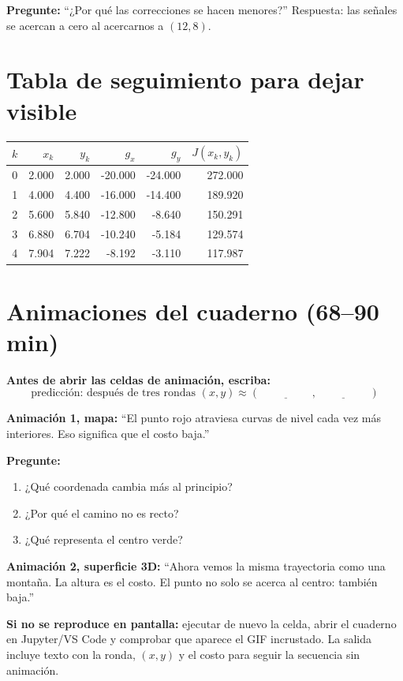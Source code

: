 \documentclass[11pt]{article}
\begin{document}
\textbf{Pregunte:} ``¿Por qué las correcciones se hacen menores?'' Respuesta:
las señales se acercan a cero al acercarnos a $(12,8)$.

\section*{Tabla de seguimiento para dejar visible}
\small
\begin{center}
\begin{tabular}{r|rr|rr|r}
\toprule
$k$&$x_k$&$y_k$&$g_x$&$g_y$&$J(x_k,y_k)$\\
\midrule
0&2.000&2.000&-20.000&-24.000&272.000\\
1&4.000&4.400&-16.000&-14.400&189.920\\
2&5.600&5.840&-12.800&-8.640&150.291\\
3&6.880&6.704&-10.240&-5.184&129.574\\
4&7.904&7.222&-8.192&-3.110&117.987\\
\bottomrule
\end{tabular}
\end{center}
\normalsize

\newpage
\section*{Animaciones del cuaderno (68--90 min)}
\textbf{Antes de abrir las celdas de animación, escriba:}
\[
\text{predicción: después de tres rondas }(x,y)\approx
(\underline{\hspace{2cm}},\underline{\hspace{2cm}})
\]

\textbf{Animación 1, mapa:} ``El punto rojo atraviesa curvas de nivel cada vez más
interiores. Eso significa que el costo baja.''

\textbf{Pregunte:}
\begin{enumerate}
\item ¿Qué coordenada cambia más al principio?
\item ¿Por qué el camino no es recto?
\item ¿Qué representa el centro verde?
\end{enumerate}

\textbf{Animación 2, superficie 3D:} ``Ahora vemos la misma trayectoria como una
montaña. La altura es el costo. El punto no solo se acerca al centro: también baja.''

\textbf{Si no se reproduce en pantalla:} ejecutar de nuevo la celda, abrir el
cuaderno en Jupyter/VS Code y comprobar que aparece el GIF incrustado. La salida
incluye texto con la ronda, $(x,y)$ y el costo para seguir la secuencia sin animación.
\end{document}
